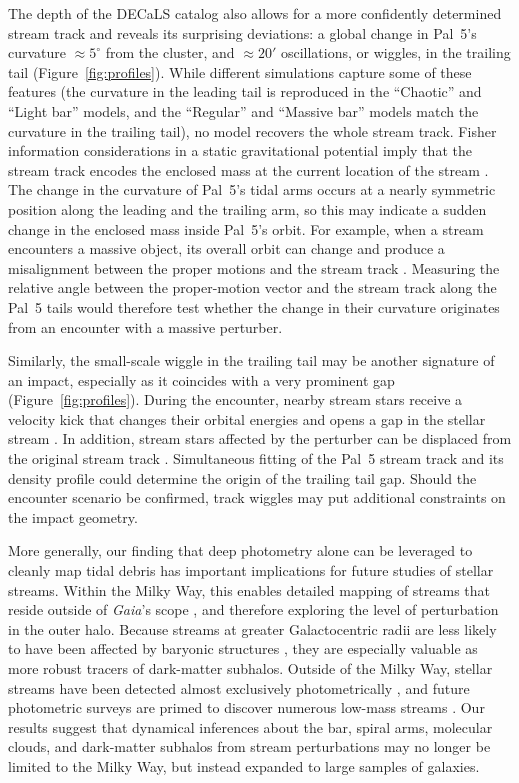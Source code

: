 \documentclass[twocolumn]{aastex62}
\newcommand{\gaia}{\textsl{Gaia}}
\begin{document}
The depth of the DECaLS catalog also allows for a more confidently determined stream track and reveals its surprising deviations: a global change in Pal~5's curvature $\approx5^\circ$ from the cluster, and $\approx20'$ oscillations, or wiggles, in the trailing tail (Figure~\ref{fig:profiles}).
While different simulations capture some of these features (the curvature in the leading tail is reproduced in the ``Chaotic'' and ``Light bar'' models, and the ``Regular'' and ``Massive bar'' models match the curvature in the trailing tail), no model recovers the whole stream track.
Fisher information considerations in a static gravitational potential imply that the stream track encodes the enclosed mass at the current location of the stream \citep{Bonaca:2018}.
The change in the curvature of Pal~5's tidal arms occurs at a nearly symmetric position along the leading and the trailing arm, so this may indicate a sudden change in the enclosed mass inside Pal~5's orbit.
For example, when a stream encounters a massive object, its overall orbit can change and produce a misalignment between the proper motions and the stream track \citep{Erkal:2018, Koposov:2019}.
Measuring the relative angle between the proper-motion vector and the stream track along the Pal~5 tails would therefore test whether the change in their curvature originates from an encounter with a massive perturber.

Similarly, the small-scale wiggle in the trailing tail may be another signature of an impact, especially as it coincides with a very prominent gap (Figure~\ref{fig:profiles}).
During the encounter, nearby stream stars receive a velocity kick that changes their orbital energies and opens a gap in the stellar stream \citep[e.g.,][]{Erkal:2015b}.
In addition, stream stars affected by the perturber can be displaced from the original stream track \citep{Bonaca:2018b}.
Simultaneous fitting of the Pal~5 stream track and its density profile could determine the origin of the trailing tail gap.
Should the encounter scenario be confirmed, track wiggles may put additional constraints on the impact geometry.

More generally, our finding that deep photometry alone can be leveraged to cleanly map tidal debris has important implications for future studies of stellar streams.
Within the Milky Way, this enables detailed mapping of streams that reside outside of \gaia's scope \citep[cf.][]{Ibata:2019}, and therefore exploring the level of perturbation in the outer halo.
Because streams at greater Galactocentric radii are less likely to have been affected by baryonic structures \citep[e.g.,][]{Banik:2019}, they are especially valuable as more robust tracers of dark-matter subhalos.
Outside of the Milky Way, stellar streams have been detected almost exclusively photometrically \citep[e.g.,][]{Martinez-Delgado:2010, Kado-Fong:2018}, and future photometric surveys are primed to discover numerous low-mass streams \citep{Pearson:2019}.
Our results suggest that dynamical inferences about the bar, spiral arms, molecular clouds, and dark-matter subhalos from stream perturbations may no longer be limited to the Milky Way, but instead expanded to large samples of galaxies.
\end{document}
